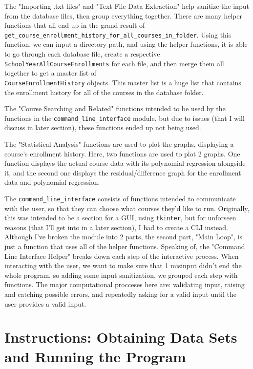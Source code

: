\documentclass[fontsize=11pt]{article}
\begin{document}
The "Importing .txt files" and "Text File Data Extraction" help sanitize the input from the database files,
then group everything together. There are many helper functions that all end up in the grand result of\\
\texttt{get\_course\_enrollment\_history\_for\_all\_courses\_in\_folder}.
Using this function, we can input a directory path, and using the helper functions, it is able to
go through each database file, create a respective\\ \texttt{SchoolYearAllCourseEnrollments} for each file,
and then merge them all together to get a master list of\\ \texttt{CourseEnrollmentHistory} objects.
This master list is a huge list that contains the enrollment history for all of the courses in the database folder.

The "Course Searching and Related" functions intended to be used by the functions in the \texttt{command\_line\_interface}
module, but due to issues (that I will discuss in later section), these functions ended up not being used.

The "Statistical Analysis" functions are used to plot the graphs, displaying a course's enrollment history.
Here, two functions are used to plot 2 graphs. One function displays the actual course data with its
polynomial regression alongside it, and the second one displays the residual/difference graph for the
enrollment data and polynomial regression.

The \texttt{command\_line\_interface} consists of functions intended to communicate with the user,
so that they can choose what courses they'd like to run.
Originally, this was intended to be a section for a GUI, using \texttt{tkinter}, but for unforseen
reasons (that I'll get into in a later section), I had to create a CLI instead. Although I've broken
the module into 2 parts, the second part, "Main Loop", is just a function that uses all of the
helper functions. Speaking of, the "Command Line Interface Helper" breaks down each step of the
interactive process. When interacting with the user, we want to make sure that 1 misinput didn't
end the whole program, so adding some input sanitization, we grouped each step with functions.
The major computational procceses here are: validating input, raising and catching possible errors,
and repeatedly asking for a valid input until the user provides a valid input.

\section*{Instructions: Obtaining Data Sets and Running the Program}
\end{document}
